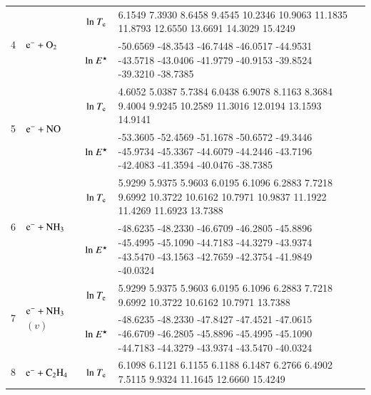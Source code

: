 \begin{table}[!htbp]
\begin{threeparttable}
\begin{tabular*}{1.1\textwidth}{l@{\extracolsep{\fill}}lcll}
  \multirow{2}{*}{4} &  \multirow{2}{*}{ $\rm e^- + O_2  $   } & ${\rm ln}~T_{\rm e}$  & \tiny         6.1549    7.3930    8.6458    9.4545   10.2346   10.9063   11.1835   11.8793   12.6550   13.6691   14.3029   15.4249 \\ 

  &  & ${\rm ln}~E^\star$     & \tiny      -50.6569  -48.3543  -46.7448  -46.0517  -44.9531  -43.5718  -43.0406  -41.9779  -40.9153  -39.8524  -39.3210  -38.7385

  \\     
  \midrule  
  
  \multirow{2}{*}{5} &  \multirow{2}{*}{ $\rm e^- + NO  $   } & ${\rm ln}~T_{\rm e}$  & \tiny    4.6052    5.0387    5.7384    6.0438    6.9078    8.1163    8.3684    9.4004    9.9245   10.2589   11.3016   12.0194   13.1593   14.9141
 \\
  &  & ${\rm ln}~E^\star$     & \tiny    -53.3605  -52.4569  -51.1678  -50.6572  -49.3446  -45.9734  -45.3367  -44.6079  -44.2446  -43.7196  -42.4083  -41.3594  -40.0476  -38.7385
  \\     
  \midrule  
        
  \multirow{2}{*}{6} &  \multirow{2}{*}{ $\rm e^- + NH_3  $   } & ${\rm ln}~T_{\rm e}$  & \tiny  5.9299    5.9375    5.9603    6.0195    6.1096    6.2883    7.7218    9.6992   10.3722   10.6162   10.7971   10.9837   11.1922   11.4269   11.6923      13.7388   \\
  
  &  & ${\rm ln}~E^\star$     & \tiny     -48.6235  -48.2330  -46.6709  -46.2805  -45.8896  -45.4995  -45.1090  -44.7183  -44.3279  -43.9374  -43.5470  -43.1563  -42.7659  -42.3754  -41.9849 
 -40.0324  \\
    \midrule  
  \multirow{2}{*}{7} &  \multirow{2}{*}{ $\rm e^- + NH_3$$(v)$   } & ${\rm ln}~T_{\rm e}$  & \tiny    5.9299    5.9375    5.9603    6.0195    6.1096    6.2883    7.7218    9.6992   10.3722   10.6162   10.7971         13.7388
  \\
  
  &  & ${\rm ln}~E^\star$     & \tiny     -48.6235  -48.2330  -47.8427  -47.4521  -47.0615  -46.6709  -46.2805  -45.8896  -45.4995  -45.1090  -44.7183  -44.3279  -43.9374  -43.5470    -40.0324
  \\  
  
    \midrule  
  \multirow{2}{*}{8} &  \multirow{2}{*}{ $\rm e^- + C_2 H_4$   } & ${\rm ln}~T_{\rm e}$  & \tiny         6.1098    6.1121    6.1155    6.1188    6.1487    6.2766    6.4902    7.5115    9.9324   11.1645   12.6660   15.4249
  \\
  

\end{tabular*}
\end{threeparttable}
\end{table}
